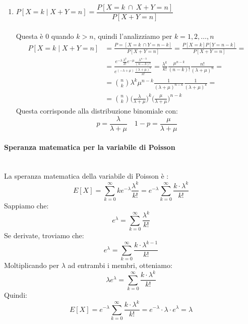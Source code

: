 \documentclass[12pt]{report}
\newcounter{exercise}
\begin{document}
\begin{exercise}{}{}
\begin{enumerate}
  	 			$P[X+Y = 0] = e^{-6}\dfrac{6^3}{3!} = e^{-6} \cdot 36$ \\ \quad \\
  	 			$P[X+Y>3] = 1 - e^{-6}(1 + 6 + 18 + 36) = 0.85$
  	 			\item $P[X=k \mid X+Y=n] = \dfrac{P[X=k\  \cap \ X+Y=n]}{P[X+Y=n]}$ \\ \quad \\
  	 			Questa è 0 quando $k > n$, quindi l'analizziamo per $k = 1, 2, \dots, n$
  	 			\begin{align*}
  	 			P[X=k\mid X+Y=n] &= \frac{P=[X=k\ \cap Y=n-k]}{P[X+Y=n]} = \frac{P[X=k]P[Y=n-k]}{P[X+Y=n]} = \\
  	 			&= \frac{e^{-\lambda}\frac{\lambda^k}{k!}e^{-\mu}\frac{\lambda^{n-k}}{(n-k)!}}{e^{(-\lambda + \mu)}\frac{(\lambda+\mu)^n}{n!}} = \frac{\lambda^k}{k!}\frac{\mu^{n-k}}{(n-k)!}\frac{n!}{(\lambda + \mu)^n} = \\
  	 			&= \binom{n}{k}\lambda^k\mu^{n-k}\frac{1}{(\lambda + \mu)^{n-k}}\frac{1}{(\lambda+\mu)^k} = \\
  	 			&= \binom{n}{k}\Bigg(\frac{\lambda}{\lambda+\mu}\Bigg)^k\Bigg(\frac{\mu}{\lambda+\mu}\Bigg)^{n-k}
  	 			\end{align*}
  	 			Questa corrisponde alla distribuzione binomiale con:\[p = \frac{\lambda}{\lambda + \mu} \quad 1 - p = \frac{\mu}{\lambda+\mu}\]
  	 		\end{enumerate}
  	 	\end{exercise}
  	 		\paragraph{Speranza matematica per la variabile di Poisson} \quad \\
  	 		La speranza matematica della variabile di Poisson è :
  	 		\[
  	 		E[X] = \sum_{k=0}^{\infty}ke^{-\lambda}\frac{\lambda^k}{k!}  = e^{-\lambda}\sum_{k=0}^{\infty}\frac{k \cdot \lambda^k}{k!}
  	 		\]
  	 		Sappiamo che:
  	 		\[
  	 		e^\lambda = \sum_{k=0}^{\infty}\frac{\lambda^k}{k!}
  	 		\]
  	 		Se derivate, troviamo che:
  	 		\[
  	 		e^\lambda = \sum_{k=0}^{\infty}\frac{k \cdot \lambda^{k-1}}{k!}
  	 		\]
  	 		Moltiplicando per $\lambda$ ad entrambi i membri, otteniamo:
  	 		\[
  	 		\lambda e^\lambda = \sum_{k=0}^{\infty}\frac{k \cdot \lambda^k}{k!}
  	 		\]
  	 		Quindi:
  	 		\[
  	 		E[X] =e^{-\lambda}\sum_{k=0}^{\infty}\frac{k \cdot \lambda^k}{k!} = e^{-\lambda} \cdot \lambda \cdot e^\lambda = \lambda
  	 		\]
\end{document}
